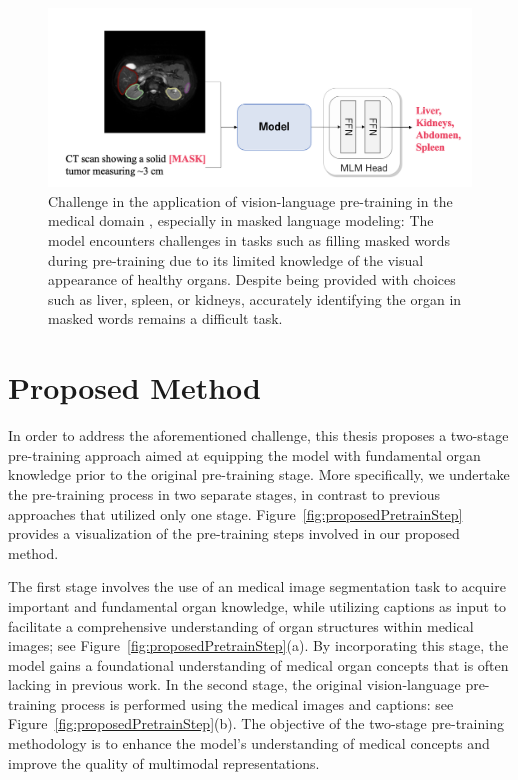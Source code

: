 \begin{figure}[t]
\begin{center}
\includegraphics[width=1.0\linewidth]{Chapter_3/chap3_problemMLM.png}
\end{center}
   \caption{Challenge in the application of vision-language pre-training in the medical domain \cite{chen2022c}, especially in masked language modeling: The model encounters challenges in tasks such as filling masked words during pre-training due to its limited knowledge of the visual appearance of healthy organs. Despite being provided with choices such as liver, spleen, or kidneys, accurately identifying the organ in masked words remains a difficult task.
}
\label{fig:probelmMLM}
\end{figure}

\section{Proposed Method}
\label{Method}
In order to address the aforementioned challenge, this thesis proposes a two-stage pre-training approach aimed at equipping the model with fundamental organ knowledge prior to the original pre-training stage. More specifically, we undertake the pre-training process in two separate stages, in contrast to previous approaches \cite{chen2022multi, chen2022align} that utilized only one stage. Figure~\ref{fig:proposedPretrainStep} provides a visualization of the pre-training steps involved in our proposed method.

The first stage involves the use of an medical image segmentation \cite{ronneberger2015u} task to acquire important and fundamental organ knowledge, while utilizing captions as input to facilitate a comprehensive understanding of organ structures within medical images; see Figure~\ref{fig:proposedPretrainStep}(a). By incorporating this stage, the model gains a foundational understanding of medical organ concepts that is often lacking in previous work. In the second stage, the original vision-language pre-training process is performed using the medical images and captions: see Figure~\ref{fig:proposedPretrainStep}(b). The objective of the two-stage pre-training methodology is to enhance the model's understanding of medical concepts and improve the quality of multimodal representations.

